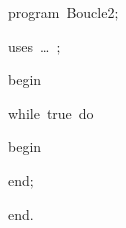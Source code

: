 
{
\parindent {}
\medskip

\carrenoir
\vspace{\neglskip}\mbox{\blc  \idt  \mcl program\idt \ Boucle2$;$
}\par 
\vspace{\neglskip}\mbox{\blc \blk\idt \mcl uses\idt \ \ldots\ $;$
}\par 
\vspace{\neglskip}\mbox{\blc  \idt  \mcl begin\idt }\par 
\pagebreak[3] 
\vspace{\neglskip}\mbox{\blc  \blk\idt  \mcl while\idt \ true\ \mcl do\idt }\par 
\vspace{\neglskip}\mbox{\blc  \blk\blk\idt  \mcl begin\idt }\par 
\vspace{\neglskip}\mbox{\blc  \blk\blk\idt  \mcl end\idt $;$}\par 
\vspace{\neglskip}\mbox{\blc  \idt  \mcl end\idt $.$}\par 

\medskip }

